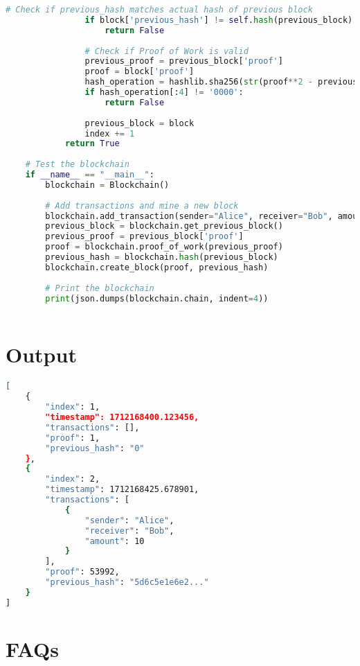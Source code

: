 \documentclass[11pt]{article}
\begin{document}
\begin{lstlisting}[language=Python]
                # Check if previous_hash matches actual hash of previous block
                if block['previous_hash'] != self.hash(previous_block):
                    return False
                
                # Check if Proof of Work is valid
                previous_proof = previous_block['proof']
                proof = block['proof']
                hash_operation = hashlib.sha256(str(proof**2 - previous_proof**2).encode()).hexdigest()
                if hash_operation[:4] != '0000':
                    return False
                
                previous_block = block
                index += 1
            return True
    
    # Test the blockchain
    if __name__ == "__main__":
        blockchain = Blockchain()
        
        # Add transactions and mine a new block
        blockchain.add_transaction(sender="Alice", receiver="Bob", amount=10)
        previous_block = blockchain.get_previous_block()
        previous_proof = previous_block['proof']
        proof = blockchain.proof_of_work(previous_proof)
        previous_hash = blockchain.hash(previous_block)
        blockchain.create_block(proof, previous_hash)
    
        # Print the blockchain
        print(json.dumps(blockchain.chain, indent=4))
    
\end{lstlisting}

\section{Output}
\begin{lstlisting}[language=bash]
[
    {
        "index": 1,
        "timestamp": 1712168400.123456,
        "transactions": [],
        "proof": 1,
        "previous_hash": "0"
    },
    {
        "index": 2,
        "timestamp": 1712168425.678901,
        "transactions": [
            {
                "sender": "Alice",
                "receiver": "Bob",
                "amount": 10
            }
        ],
        "proof": 53992,
        "previous_hash": "5d6c5e1e6e2..."
    }
]

\end{lstlisting}

\section{FAQs}
\end{document}
